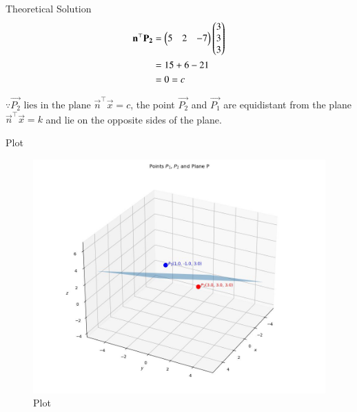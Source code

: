 \documentclass{beamer}
\begin{document}
\begin{frame}{Theoretical Solution}
\begin{align}
    \mathbf{n}^\top\mathbf{P_2} &= \begin{pmatrix}5 & 2 & -7\end{pmatrix}\begin{pmatrix}3 \\ 3 \\ 3\end{pmatrix} \\
    &= 15+6-21 \\
    &= 0 = c
\end{align}

$\because \vec{P_2}\text{ lies in the plane }\vec{n}^\top\vec{x}=c$, the point $\vec{P_2}$ and $\vec{P_1}$ are equidistant from the plane $\vec{n}^\top\vec{x} = k$ and lie on the opposite sides of the plane.
\end{frame}

\begin{frame}{Plot}
    \begin{figure}
        \centering
        \includegraphics[width=0.5\columnwidth]{../figs/plot_c.jpg}
        \caption{Plot}
        \label{fig:fig}
    \end{figure}
\end{frame}
\end{document}
